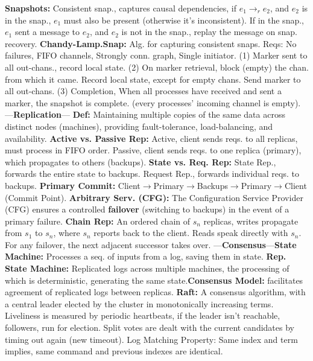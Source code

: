 \newpage

\begin{multicols}{2}
    
    \noindent
    \textbf{Snapshots:} Consistent snap., captures causal dependencies, if 
    $e_1 \to_r e_2$, and $e_2$ is in the snap., $e_1$ must also be present (otherwise it's inconsistent). If in the 
    snap., $e_1$ sent a message to $e_2$, and $e_2$ is not in the snap., replay the message on snap. recovery.
    \textbf{Chandy-Lamp.Snap:} Alg. for capturing consistent snaps. Reqs: No failures, FIFO channels, Strongly conn. graph, Single initiator.
    (1) Marker sent to all out-chans., record local state. (2) On marker retrieval, block (empty) the chan. from which it came. Record local state, except for empty chans. Send marker to all out-chans.
    (3) Completion, When all processes have received and sent a marker, the snapshot is complete.
    (every processes' incoming channel is empty).
    ---\textbf{Replication}---
    \textbf{Def:} Maintaining multiple copies of the same data across distinct nodes (machines), providing fault-tolerance, load-balancing, and availability.
    \textbf{Active vs. Passive Rep:} Active, client sends reqs. to all replicas, must process in FIFO order. Passive, client sends reqs. to one replica (primary), which propagates to others (backups).
    \textbf{State vs. Req. Rep:} State Rep., forwards the entire state to backups. Request Rep., forwards individual reqs. to backups.
    \textbf{Primary Commit:} Client$\to$Primary$\to$Backups$\to$Primary$\to$Client (Commit Point).
    \textbf{Arbitrary Serv. (CFG):} The Configuration Service Provider (CFG) ensures a controlled \textbf{failover} (switching to backups) in the event of a primary failure.
    \textbf{Chain Rep:} An ordered chain of $s_n$ replicas, writes propagate from $s_1$ to $s_n$, where $s_n$ reports back to the client. Reads speak directly with $s_n$. For any failover, the next adjacent successor takes over.
    ---\textbf{Consensus}---\textbf{State Machine:}
    Processes a seq. of inputs from a log, saving them in state. \textbf{Rep. State Machine:} Replicated logs across multiple machines, the processing of 
    which is deterministic, generating the same state.\textbf{Consensus Model:} facilitates agreement of replicated logs between replicas.
    \textbf{Raft:} A consensus algorithm, with a central leader elected by the cluster in monotonically increasing terms. Liveliness is measured by periodic heartbeats, if the leader
    isn't reachable, followers, run for election. Split votes are dealt with the current candidates by timing out again (new timeout). Log Matching Property: Same index and term implies, same command and previous indexes are identical.

\end{multicols}
